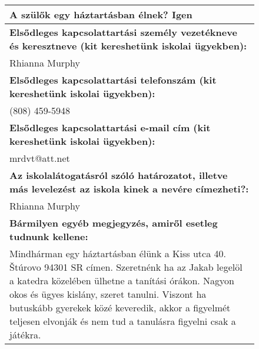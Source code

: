 \documentclass[10pt,a4paper]{article}
\begin{document}
\begin{figure}[!ht]
\begin{tabular}{|m{\textwidth}|}
\hline\vspace{3pt}
\textbf{A szülők egy háztartásban élnek? } \hspace{0.5cm} Igen \vspace{3pt} \\
\hline\vspace{3pt}
\textbf{Elsődleges kapcsolattartási személy vezetékneve és keresztneve (kit kereshetünk iskolai ügyekben):} \\ \hspace{0.5cm} Rhianna Murphy \vspace{3pt} \\
\hline\vspace{3pt}
\textbf{Elsődleges kapcsolattartási telefonszám (kit kereshetünk iskolai ügyekben):} \\ \hspace{0.5cm} (808) 459-5948 \vspace{3pt} \\
\hline\vspace{3pt}
\textbf{Elsődleges kapcsolattartási e-mail cím (kit kereshetünk iskolai ügyekben):} \\ \hspace{0.5cm} mrdvt@att.net \vspace{3pt} \\
\hline\vspace{3pt}
\textbf{Az iskolalátogatásról szóló határozatot, illetve más levelezést az iskola kinek a nevére címezheti?:} \\ \hspace{0.5cm} Rhianna Murphy \vspace{3pt} \\
\hline\vspace{3pt}
\textbf{Bármilyen egyéb megjegyzés, amiről esetleg tudnunk kellene:} \\ \hspace{0.5cm} Mindhárman egy háztartásban élünk a Kiss utca 40. Štúrovo 94301 SR címen.
Szeretnénk ha az Jakab legelöl a katedra közelében ülhetne a tanítási órákon. Nagyon okos és ügyes kislány, szeret tanulni. Viszont ha butuskább gyerekek közé keveredik, akkor a figyelmét teljesen elvonják és nem tud a tanulásra figyelni csak a játékra. \vspace{3pt} \\


\end{tabular}
\end{figure}
\end{document}

